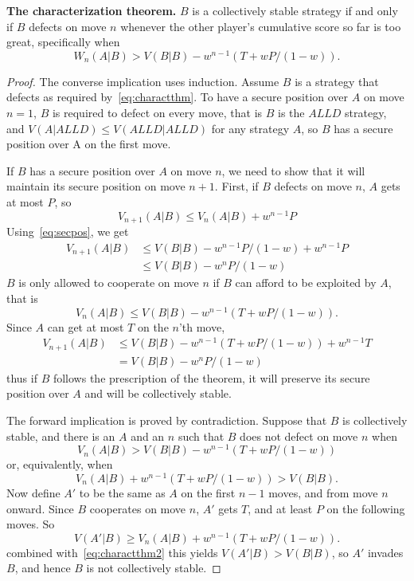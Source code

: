 \begin{theorem}\textbf{The characterization theorem.} \label{thm:charactthm}
$B$ is a collectively stable strategy if and only if $B$ defects on move $n$ whenever the other player's cumulative score so far is too great, specifically when
\begin{equation}\label{eq:charactthm}
W_n(A|B) > V(B|B) - w^{n-1}(T + wP/(1-w)).
\end{equation}
\end{theorem}

\begin{proof}
The converse implication uses induction. Assume $B$ is a strategy that defects as required by~\ref{eq:charactthm}. To have a secure position over $A$ on move $n=1$, $B$ is required to defect on every move, that is $B$ is the $ALLD$ strategy, and $V(A | ALLD) \leq V(ALLD | ALLD)$ for any strategy $A$, so $B$ has a secure position over A on the first move.

If $B$ has a secure position over $A$ on move $n$, we need to show that it will maintain its secure position on move $n+1$. First, if $B$ defects on move $n$, $A$ gets at most $P$, so
\[
V_{n+1}(A|B) \leq V_n(A|B) + w^{n-1}P
\]
Using~\ref{eq:secpos}, we get
\begin{align*}
V_{n+1}(A|B) 
&\leq V(B|B) - w^{n-1}P/(1-w) + w^{n-1}P \\
&\leq V(B|B) - w^{n}P/(1-w)
\end{align*}
$B$ is only allowed to cooperate on move $n$ if $B$ can afford to be exploited by $A$, that is
\[
V_n (A | B) \leq V(B | B) - w^{n-1}(T + wP/(1-w)).
\]
Since $A$ can get at most $T$ on the $n$'th move,
\begin{align*}
V_{n+1} (A | B)
&\leq V(B | B) - w^{n-1} (T + wP/(1-w)) + w^{n-1}T \\
&= V(B | B) - w^n P / (1-w)
\end{align*}
thus if $B$ follows the prescription of the theorem, it will preserve its secure position over $A$ and will be collectively stable.

The forward implication is proved by contradiction. Suppose that $B$ is collectively stable, and there is an $A$ and an $n$ such that $B$ does not defect on move $n$ when
\[
V_n (A | B) > V(B | B) - w^{n-1}(T + wP / (1-w))
\]
or, equivalently, when
\begin{equation}\label{eq:charactthm2}
V_n (A | B) + w^{n-1}(T + wP / (1-w)) > V(B | B).
\end{equation}
Now define $A'$ to be the same as $A$ on the first $n-1$ moves, and from move $n$ onward. Since $B$ cooperates on move $n$, $A'$ gets $T$, and at least $P$ on the following moves. So
\[
V(A'|B) \geq V_n (A | B) + w^{n-1}(T + wP/(1-w)).
\]
combined with~\ref{eq:charactthm2} this yields $V(A' | B) > V(B | B)$, so $A'$ invades $B$, and hence $B$ is not collectively stable.
\end{proof}

